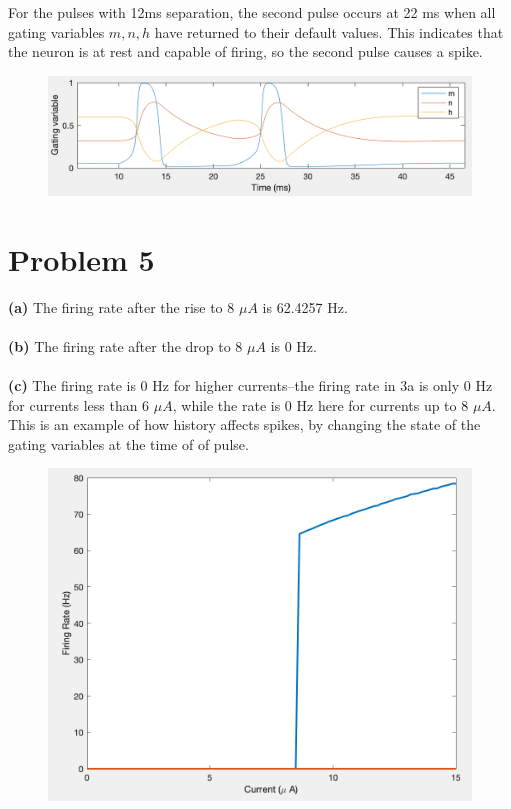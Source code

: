 \documentclass[]{article}
\begin{document}
For the pulses with 12ms separation, the second pulse occurs at 22 ms when all gating variables $m,n,h$ have returned to their default values. This indicates that the neuron is at rest and capable of firing, so the second pulse causes a spike.
\begin{figure}
    \centering
    \includegraphics[scale=0.5]{gating12ms.png}
    \label{fig:gating12ms}
\end{figure}


\section*{Problem 5}
\textbf{(a)} The firing rate after the rise to 8 $\mu A$ is 62.4257 Hz.
\\\\
\textbf{(b)} The firing rate after the drop to 8 $\mu A$ is 0 Hz.
\\\\
\textbf{(c)} The firing rate is 0 Hz for higher currents--the firing rate in 3a is only 0 Hz for currents less than 6 $\mu A$, while the rate is 0 Hz here for currents up to 8 $\mu A$. This is an example of how history affects spikes, by changing the state of the gating variables at the time of of pulse.

\begin{figure}
    \centering
    \includegraphics[scale=0.5]{history_firing_rate.png}
    \label{fig:history_rate}
\end{figure}
\end{document}
